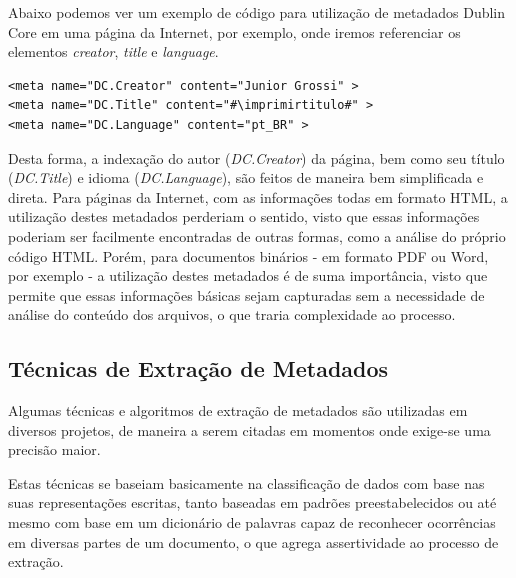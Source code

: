 \begin{textnew}
Abaixo podemos ver um exemplo de código para utilização de metadados Dublin Core em uma página da Internet, por exemplo, onde iremos referenciar os elementos \textit{creator}, \textit{title} e \textit{language}.

\lstset{language=HTML}
\begin{lstlisting}[escapechar=\#]
<meta name="DC.Creator" content="Junior Grossi" >
<meta name="DC.Title" content="#\imprimirtitulo#" >
<meta name="DC.Language" content="pt_BR" >
\end{lstlisting}

Desta forma, a indexação do autor (\textit{DC.Creator}) da página, bem como seu título (\textit{DC.Title}) e idioma (\textit{DC.Language}), são feitos de maneira bem simplificada e direta. Para páginas da Internet, com as informações todas em formato HTML, a utilização destes metadados perderiam o sentido, visto que essas informações poderiam ser facilmente encontradas de outras formas, como a análise do próprio código HTML. Porém, para documentos binários - em formato PDF ou Word, por exemplo - a utilização destes metadados é de suma importância, visto que permite que essas informações básicas sejam capturadas sem a necessidade de análise do conteúdo dos arquivos, o que traria complexidade ao processo.

\end{textnew}

\subsection{Técnicas de Extração de Metadados}
\label{ssec:metadata-techniques}


Algumas técnicas e algoritmos de extração de metadados são utilizadas em diversos projetos, de maneira a serem citadas em momentos onde exige-se uma precisão maior.

\begin{textedited}
Estas técnicas se baseiam basicamente na classificação de dados com base nas suas representações escritas, tanto baseadas em padrões preestabelecidos ou até mesmo com base em um dicionário de palavras capaz de reconhecer ocorrências em diversas partes de um documento, o que agrega assertividade ao processo de extração.
\end{textedited}


